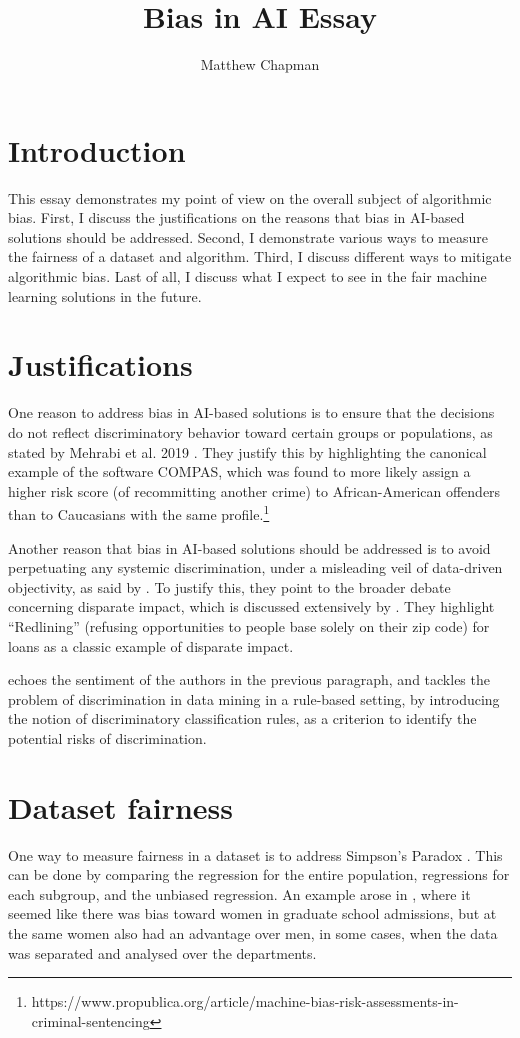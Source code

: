 \documentclass{article}
\title{Bias in AI Essay}
\author{Matthew Chapman}
\begin{document}
\maketitle

\section{Introduction}
This essay demonstrates my point of view on the overall subject of algorithmic bias. First, I discuss the justifications on the reasons that bias in AI-based solutions should be addressed. Second, I demonstrate various ways to measure the fairness of a dataset and algorithm. Third, I discuss different ways to mitigate algorithmic bias. Last of all, I discuss what I expect to see in the fair machine learning solutions in the future.

\section{Justifications}
One reason to address bias in AI-based solutions is to ensure that the decisions do not reflect discriminatory behavior toward certain groups or populations, as stated by Mehrabi et al. 2019 \autocite{DBLP:journals/corr/abs-1908-09635}. They justify this by highlighting the canonical example of the software COMPAS, which was found to more likely assign a higher risk score (of recommitting another crime) to African-American offenders than to Caucasians with the same profile.\footnote{https://www.propublica.org/article/machine-bias-risk-assessments-in-criminal-sentencing}  

Another reason that bias in AI-based solutions should be addressed is to avoid perpetuating any systemic discrimination, under a misleading veil of data-driven objectivity, as said by \autocite{d_Alessandro_2017}. To justify this, they point to the broader debate concerning disparate impact, which is discussed extensively by \autocite{10.2307/24758720}. They highlight “Redlining” (refusing opportunities to people base solely on their zip code) for loans as a classic example of disparate impact.

\autocite{10.1145/1401890.1401959} echoes the sentiment of the authors in the previous paragraph, and tackles the problem of discrimination in data mining in a rule-based setting, by introducing the notion of discriminatory classification rules, as a criterion to identify the potential risks of discrimination.

\section{Dataset fairness}
One way to measure fairness in a dataset is to address Simpson's Paradox \autocite{10.2307/2284382}. This can be done by comparing the regression for the entire population, regressions for each subgroup, and the unbiased regression. An example arose in \autocite{Bickel398}, where it seemed like there was bias toward women in graduate school admissions, but at the same women also had an advantage over men, in some cases, when the data was separated and analysed over the departments.
\end{document}
